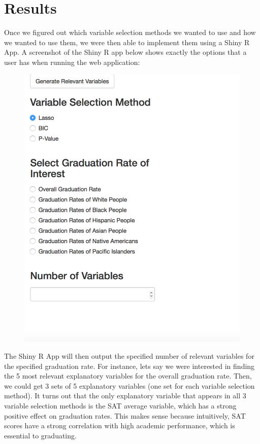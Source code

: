 \documentclass{article}
\begin{document}



\section{Results}
Once we figured out which variable selection methods we wanted to use and how we wanted to use them, we were then able to implement them using a Shiny R App. A screenshot of the Shiny R app below shows exactly the options that a user has when running the web application:\\

\begin{figure}[!htb]
\includegraphics{../../images/screenshot.png}
\end{figure}


The Shiny R App will then output the specified number of relevant variables for the specified graduation rate. For instance, lets say we were interested in finding the 5 most relevant explanatory variables for the overall graduation rate. Then, we could get 3 sets of 5 explanatory variables (one set for each variable selection method). It turns out that the only explanatory variable that appears in all 3 variable selection methods is the SAT average variable, which has a strong positive effect on graduation rates. This makes sense because intuitively, SAT scores have a strong correlation with high academic performance, which is essential to graduating. 
\end{document}
